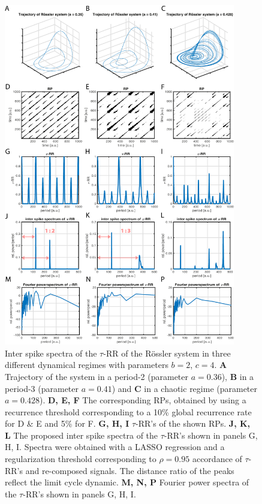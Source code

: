 \documentclass[entropy,article,submit,pdftex,moreauthors]{Definitions/mdpi}
\begin{document}
\begin{figure}
 \centering
 \includegraphics[width=0.9\textwidth]{./figures/fig_tau_rr_example_roessler}
 \caption{Inter spike spectra of the $\tau$-RR of the R\"ossler system in three different dynamical regimes with parameters $b=2$, $c=4$. 
 \textbf{A} Trajectory of the system in a period-2 (parameter $a=0.36$), \textbf{B} in a period-3 (parameter $a=0.41$) and 
 \textbf{C} in a chaotic regime (parameter $a=0.428$). 
 \textbf{D, E, F} The corresponding RPs, obtained by using a recurrence threshold corresponding to a 10\% global 
 recurrence rate for D \& E and 5\% for F. 
  \textbf{G, H, I} $\tau$-RR's of the shown RPs. 
  \textbf{J, K, L} The proposed inter spike spectra of the $\tau$-RR's shown in panels G, H, I. Spectra were obtained with a LASSO regression and a regularization threshold 
  corresponding to $\rho=0.95$ accordance of $\tau$-RR's and re-composed signals. The distance ratio of the peaks reflect the limit cycle dynamic.  
  \textbf{M, N, P} Fourier power spectra of the $\tau$-RR's shown in panels G, H, I. }
\label{fig_tau_rr_example_roessler}
\end{figure}
\end{document}

